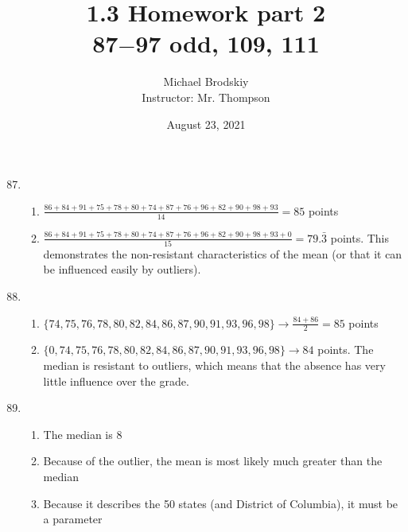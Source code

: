 \documentclass[12pt]{article}
\title{1.3 Homework part 2\\ 87$-$97 odd, 109, 111}
\date{August 23, 2021}
\author{Michael Brodskiy\\ \small Instructor: Mr. Thompson}
\begin{document}
\maketitle

\begin{enumerate}

    \setcounter{enumi}{86}

  \item

    \begin{enumerate}

      \item $\frac{86 + 84 + 91 + 75 + 78 + 80 + 74 + 87 + 76 + 96 + 82 + 90 + 98 + 93}{14}=85$ points

      \item $\frac{86 + 84 + 91 + 75 + 78 + 80 + 74 + 87 + 76 + 96 + 82 + 90 + 98 + 93 + 0}{15}=79.\bar{3}$ points. This demonstrates the non-resistant characteristics of the mean (or that it can be influenced easily by outliers).

    \end{enumerate}

    \setcounter{enumi}{88}

  \item

    \begin{enumerate}

      \item $\{ 74, 75, 76, 78, 80, 82, 84, 86, 87, 90, 91, 93, 96, 98\}\rightarrow \frac{84 + 86}{2}=85$ points

      \item $\{ 0, 74, 75, 76, 78, 80, 82, 84, 86, 87, 90, 91, 93, 96, 98\}\rightarrow 84$ points. The median is resistant to outliers, which means that the absence has very little influence over the grade.

    \end{enumerate}

    \setcounter{enumi}{90}

  \item

    \begin{enumerate}

      \item The median is 8

      \item Because of the outlier, the mean is most likely much greater than the median

      \item Because it describes the 50 states (and District of Columbia), it must be a parameter


\end{enumerate}
\end{enumerate}
\end{document}
